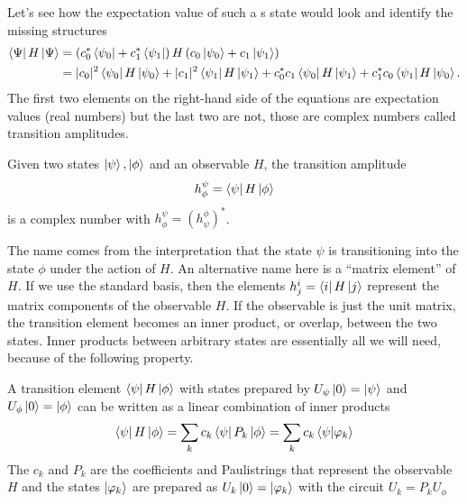 Let's see how the expectation value of such a s state would look and identify the missing structures
\begin{align}
    \bra{\Psi}H\ket{\Psi} &= \left(c_0^*\bra{\psi_0} + c_1^*\bra{\psi_1}\right)H\left(c_0\ket{\psi_0} + c_1\ket{\psi_1}\right)\\\
    &= |c_0|^2 \bra{\psi_0}H\ket{\psi_0} + |c_1|^2 \bra{\psi_1}H\ket{\psi_1} + c_0^*c_1\bra{\psi_0}H\ket{\psi_1} + c_1^*c_0 \bra{\psi_1}H\ket{\psi_0}. \nonumber \end{align}
The first two elements on the right-hand side of the equations are expectation values (real numbers) but the last two are not, those are complex numbers called transition amplitudes.
\begin{def*}
    Given two states $\ket{\psi},\ket{\phi}$ and an observable $H$, the transition amplitude
    \begin{align*}
        h^\psi_\phi = \bra{\psi}H\ket{\phi}
    \end{align*}
    is a complex number with $h_\phi^\psi=\left(h_\psi^\phi\right)^*$.
\end{def*}
The name comes from the interpretation that the state $\psi$ is transitioning into the state $\phi$ under the action of $H$. 
An alternative name here is a ``matrix element'' of $H$. If we use the standard basis, then the elements $h^i_j=\bra{i}H\ket{j}$ represent the matrix components of the observable $H$.
If the observable is just the unit matrix, the transition element becomes an inner product, or overlap, between the two states. Inner products between arbitrary states are essentially all we will need, because of the following property.
\begin{theorem*}
    A transition element $\bra{\psi}H\ket{\phi}$ with states prepared by $U_\psi\ket{0} = \ket{\psi}$ and $U_\phi\ket{0}=\ket{\phi}$ can be written as a linear combination of inner products
    \begin{align}
        \bra{\psi}H\ket{\phi} = \sum_k c_k \bra{\psi}P_k\ket{\phi} = \sum_k c_k \braket{\psi}{\varphi_k}
    \end{align}
    The $c_k$ and $P_k$ are the coefficients and Paulistrings that represent the observable $H$ and the states $\ket{\varphi_k}$ are prepared as $U_{k}\ket{0} = \ket{\varphi_k}$ with the circuit $U_{k} = P_kU_\phi$
\end{theorem*}



